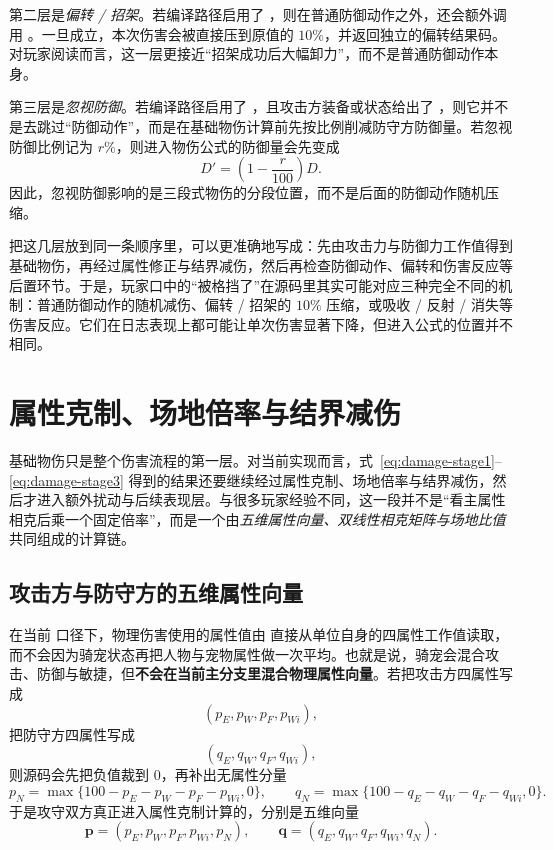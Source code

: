 第二层是\emph{偏转 / 招架}。若编译路径启用了 ，则在普通防御动作之外，还会额外调用 。一旦成立，本次伤害会被直接压到原值的 $10\%$，并返回独立的偏转结果码。对玩家阅读而言，这一层更接近“招架成功后大幅卸力”，而不是普通防御动作本身。

第三层是\emph{忽视防御}。若编译路径启用了 ，且攻击方装备或状态给出了 ，则它并不是去跳过“防御动作”，而是在基础物伤计算前先按比例削减防守方防御量。若忽视防御比例记为 $r\%$，则进入物伤公式的防御量会先变成
\begin{equation}
    D' = \left(1-\frac{r}{100}\right)D.
\end{equation}
因此，忽视防御影响的是三段式物伤的分段位置，而不是后面的防御动作随机压缩。

把这几层放到同一条顺序里，可以更准确地写成：先由攻击力与防御力工作值得到基础物伤，再经过属性修正与结界减伤，然后再检查防御动作、偏转和伤害反应等后置环节。于是，玩家口中的“被格挡了”在源码里其实可能对应三种完全不同的机制：普通防御动作的随机减伤、偏转 / 招架的 $10\%$ 压缩，或吸收 / 反射 / 消失等伤害反应。它们在日志表现上都可能让单次伤害显著下降，但进入公式的位置并不相同。


\section{属性克制、场地倍率与结界减伤}

基础物伤只是整个伤害流程的第一层。对当前实现而言，式~\eqref{eq:damage-stage1}--\eqref{eq:damage-stage3} 得到的结果还要继续经过属性克制、场地倍率与结界减伤，然后才进入额外扰动与后续表现层。与很多玩家经验不同，这一段并不是“看主属性相克后乘一个固定倍率”，而是一个由\emph{五维属性向量、双线性相克矩阵与场地比值}共同组成的计算链。

\subsection{攻击方与防守方的五维属性向量}

在当前  口径下，物理伤害使用的属性值由  直接从单位自身的四属性工作值读取，而不会因为骑宠状态再把人物与宠物属性做一次平均。也就是说，骑宠会混合攻击、防御与敏捷，但\textbf{不会在当前主分支里混合物理属性向量}。若把攻击方四属性写成
\begin{equation}
    (p_E,p_W,p_F,p_{Wi}),
\end{equation}
把防守方四属性写成
\begin{equation}
    (q_E,q_W,q_F,q_{Wi}),
\end{equation}
则源码会先把负值裁到 $0$，再补出无属性分量
\begin{equation}
    p_N = \max\{100-p_E-p_W-p_F-p_{Wi},0\},
    \qquad
    q_N = \max\{100-q_E-q_W-q_F-q_{Wi},0\}.
    \label{eq:none-attr}
\end{equation}
于是攻守双方真正进入属性克制计算的，分别是五维向量
\begin{equation}
    \bm{p}=(p_E,p_W,p_F,p_{Wi},p_N),
    \qquad
    \bm{q}=(q_E,q_W,q_F,q_{Wi},q_N).
\end{equation}


